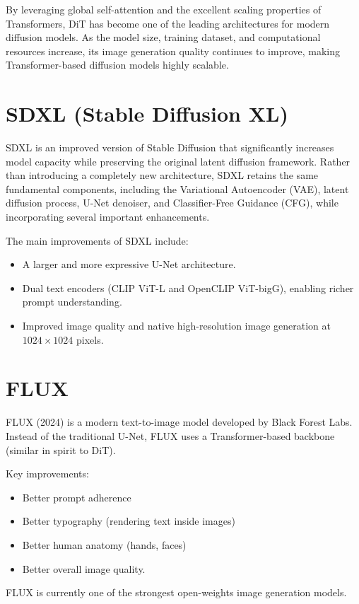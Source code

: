 By leveraging global self-attention and the excellent scaling properties of Transformers, DiT has become one of the leading architectures for modern diffusion models. As the model size, training dataset, and computational resources increase, its image generation quality continues to improve, making Transformer-based diffusion models highly scalable.

\section{SDXL (Stable Diffusion XL)}

SDXL is an improved version of Stable Diffusion that significantly increases model capacity while preserving the original latent diffusion framework. Rather than introducing a completely new architecture, SDXL retains the same fundamental components, including the Variational Autoencoder (VAE), latent diffusion process, U-Net denoiser, and Classifier-Free Guidance (CFG), while incorporating several important enhancements.

The main improvements of SDXL include:

\begin{itemize}
    \item A larger and more expressive U-Net architecture.
    \item Dual text encoders (CLIP ViT-L and OpenCLIP ViT-bigG), enabling richer prompt understanding.
    \item Improved image quality and native high-resolution image generation at $1024 \times 1024$ pixels.
\end{itemize}
\section{FLUX}

FLUX (2024) is a modern text-to-image model developed by Black Forest Labs.
Instead of the traditional U-Net, FLUX uses a Transformer-based backbone (similar in spirit to DiT).

Key improvements:
\begin{itemize}
    \item Better prompt adherence
    \item Better typography (rendering text inside images)
    \item Better human anatomy (hands, faces)
    \item Better overall image quality.
\end{itemize}
FLUX is currently one of the strongest open-weights image generation models.

